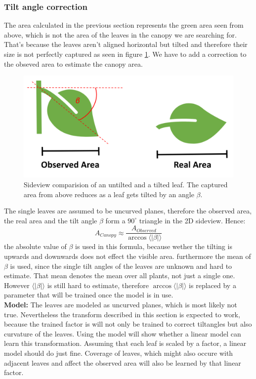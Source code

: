\subsubsection{Tilt angle correction}
The area calculated in the previous section represents the green area seen from above, which is not the area of the leaves in the canopy we are searching for. That's because the leaves aren't aligned horizontal but tilted and therefore their size is not perfectly captured as seen in figure \ref{fig:tiltedLeaf}. We have to add a correction to the obseved area to estimate the canopy area.\\
   \begin{figure}[H]
       \centering
       \includegraphics[scale=0.6]{tiltedLeaf.PNG}
       \caption{Sideview comparision of an untilted and a tilted leaf. The captured area from above reduces as a leaf gets tilted by an angle $\beta$.}
       \label{fig:tiltedLeaf}
   \end{figure}
The single leaves are assumed to be uncurved planes, therefore the observed area, the real area and the tilt angle $\beta$ form a $90^{\circ}$ triangle in the 2D sideview. Hence:
$$A_{Canopy} \approx \frac{A_{Observed}}{\arccos \langle |\beta |\rangle }$$
the absolute value of $\beta$ is used in this formula, because wether the tilting is upwards and downwards does not effect the visible area. furthermore the mean of $\beta$ is used, since the single tilt angles of the leaves are unknown and hard to estimate. That mean denotes the mean over all plants, not just a single one. However $\langle |\beta |\rangle$ is still hard to estimate, therefore $\arccos \langle |\beta |\rangle$ is replaced by a parameter that will be trained once the model is in use.\\
\textbf{Model: } The leaves are modeled as uncurved planes, which is most likely not true. Nevertheless the transform described in this section is expected to work, because the trained factor is will not only be trained to correct tiltangles but also curvature of the leaves. Using the model will show whether a linear model can learn this transformation. Assuming that each leaf is scaled by a factor, a linear model should do just fine. Coverage of leaves, which might also occure with adjacent leaves and affect the observed area will also be learned by that linear factor.
